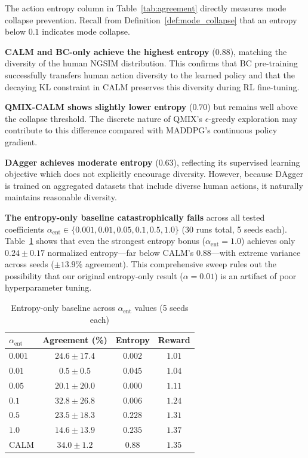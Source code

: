 \documentclass[journal]{IEEEtran}
\begin{document}
The action entropy column in Table~\ref{tab:agreement} directly measures mode collapse prevention. Recall from Definition~\ref{def:mode_collapse} that an entropy below $0.1$ indicates mode collapse.

\textbf{CALM and BC-only achieve the highest entropy} ($0.88$), matching the diversity of the human NGSIM distribution. This confirms that BC pre-training successfully transfers human action diversity to the learned policy and that the decaying KL constraint in CALM preserves this diversity during RL fine-tuning.

\textbf{QMIX-CALM shows slightly lower entropy} ($0.70$) but remains well above the collapse threshold. The discrete nature of QMIX's $\epsilon$-greedy exploration may contribute to this difference compared with MADDPG's continuous policy gradient.

\textbf{DAgger achieves moderate entropy} ($0.63$), reflecting its supervised learning objective which does not explicitly encourage diversity. However, because DAgger is trained on aggregated datasets that include diverse human actions, it naturally maintains reasonable diversity.

\textbf{The entropy-only baseline catastrophically fails} across all tested coefficients $\alpha_\mathrm{ent} \in \{0.001, 0.01, 0.05, 0.1, 0.5, 1.0\}$ (30 runs total, 5 seeds each). Table~\ref{tab:entropy_tuning} shows that even the strongest entropy bonus ($\alpha_\mathrm{ent} = 1.0$) achieves only $0.24 \pm 0.17$ normalized entropy---far below CALM's $0.88$---with extreme variance across seeds ($\pm 13.9\%$ agreement). This comprehensive sweep rules out the possibility that our original entropy-only result ($\alpha = 0.01$) is an artifact of poor hyperparameter tuning.

\begin{table}[t]
\centering
\caption{Entropy-only baseline across $\alpha_\mathrm{ent}$ values (5 seeds each)}
\label{tab:entropy_tuning}
\footnotesize
\begin{tabular}{lccc}
\toprule
$\alpha_\mathrm{ent}$ & \textbf{Agreement (\%)} & \textbf{Entropy} & \textbf{Reward} \\
\midrule
$0.001$ & $24.6 \pm 17.4$ & $0.002$ & $1.01$ \\
$0.01$  & $0.5 \pm 0.5$   & $0.045$ & $1.04$ \\
$0.05$  & $20.1 \pm 20.0$ & $0.000$ & $1.11$ \\
$0.1$   & $32.8 \pm 26.8$ & $0.006$ & $1.24$ \\
$0.5$   & $23.5 \pm 18.3$ & $0.228$ & $1.31$ \\
$1.0$   & $14.6 \pm 13.9$ & $0.235$ & $1.37$ \\
\midrule
CALM    & $34.0 \pm 1.2$  & $0.88$  & $1.35$ \\
\bottomrule
\end{tabular}
\end{table}
\end{document}

